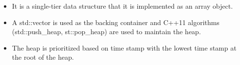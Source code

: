 \documentclass[table]{beamer}
\begin{document}
\begin{frame}
\begin{itemize}
\item It is a single-tier data structure that it is implemented as an array object.
\item A std::vector is used as the backing container and C++11 algorithms (std::push\_heap, st::pop\_heap) are used to maintain the heap.
\item The heap is prioritized based on time stamp with the lowest time stamp at the root of the heap.
\end{itemize}
\end{frame}

\end{document}
